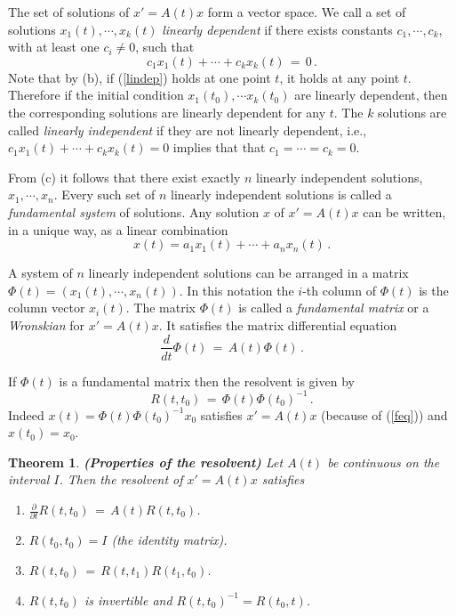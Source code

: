 \documentclass[12pt]{report}
\newtheorem{theorem}{Theorem}[section]
\def\eqref#1{(\ref{#1})}
\begin{document}
\medskip

 The set of solutions of $x'= A(t)x$ form a vector space. We
call a set of solutions $x_1(t), \cdots, x_k(t)$ {\em linearly
dependent} if there exists constants $c_1, \cdots, c_k$, with at least
one $c_i \not=0$, such that
\begin{equation} \label{lindep}
c_1 x_1(t) + \cdots + c_k x_k(t) \,=\, 0\,.
\end{equation} 
Note that by (b), if \eqref{lindep} holds at one point $t$, it holds
at any point $t$.  Therefore if the initial condition $x_1(t_0),
\cdots x_k(t_0)$ are linearly dependent, then the corresponding
solutions are linearly dependent for any $t$.  The $k$ solutions are called {\em
linearly independent} if they are not linearly dependent, i.e., $c_1
x_1(t) + \cdots + c_k x_k(t)=0$ implies that that $c_1=\cdots=c_k=0$.

\medskip

 From (c) it follows that there exist exactly $n$ linearly
independent solutions, $x_1, \cdots, x_n$.  Every such set of $n$
linearly independent solutions is called a {\em fundamental system} of
solutions. Any solution $x$ of $x'= A(t)x$ can be written, in a unique
way, as a linear combination
\begin{equation}
x(t)=a_1 x_1(t) + \cdots + a_n x_n(t) \,.
\end{equation}

\medskip

 A system of $n$ linearly independent solutions can be
arranged in a matrix $\Phi(t) = (x_1(t), \cdots, x_n(t))$. In this
notation the $i$-th column of $\Phi(t)$ is the column vector $x_i(t)$. The
matrix $\Phi(t)$ is called a {\em fundamental matrix} or a {\em
Wronskian} for $x'=A(t)x$. It satisfies the matrix differential equation
\begin{equation}\label{feq}
\frac{d}{dt} \Phi(t) \,=\, A(t) \Phi(t)\,.  
\end{equation}

\medskip
 
 If $\Phi(t)$ is a fundamental matrix then the resolvent is given by
\begin{equation}
R(t,t_0)\,=\, \Phi(t) \Phi(t_0)^{-1}\,.
\end{equation}
Indeed $x(t)=\Phi(t) \Phi(t_0)^{-1}x_0$ satisfies $x'=A(t)x$ (because
of \eqref{feq}) and $x(t_0)=x_0$.  


\begin{theorem}\label{resprop}{\bf
(Properties of the resolvent)} Let $A(t)$ be continuous on the
interval $I$. Then the resolvent of $x'=A(t)x$ satisfies 
\begin{enumerate}
\item $\frac{\partial }{\partial t} R(t,t_0) \,=\, A(t) R(t,t_0)$.
\item $R(t_0,t_0)=I$ (the identity matrix). 
\item $R(t,t_0)\,=\, R(t,t_1)R(t_1,t_0)$.  
\item $R(t,t_0)$ is invertible and $R(t,t_0)^{-1}=R(t_0,t)$. 
\end{enumerate}
\end{theorem}
\end{document}
